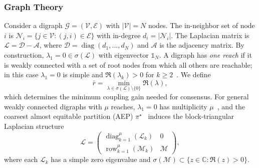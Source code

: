 \documentclass[12pt]{elsarticle}
\theoremstyle{remark}
\DeclareMathOperator{\diag}{diag}
\DeclareMathOperator{\row}{row}
\newcommand{\C}{\mathbb{C}}
\newcommand{\ones}{\mathbb{1}}
\begin{document}
\subsubsection{Graph Theory}
\label{subsec:graphs}
Consider a digraph $\mathcal{G} = (\mathcal{V}, \mathcal{E})$ with $|\mathcal{V}| = N$ nodes. The in-neighbor set of node $i$ is $\mathcal{N}_i = \{j \in \mathcal{V} : (j,i) \in \mathcal{E}\}$ with in-degree $d_i = |\mathcal{N}_i|$. The Laplacian matrix is $\mathcal{L} = \mathcal{D} - \mathcal{A}$, where $\mathcal{D} = \diag(d_1, \ldots, d_N)$ and $\mathcal{A}$ is the adjacency matrix. By construction, $\lambda_1 = 0 \in \sigma(\mathcal{L})$ with eigenvector $\ones_N$. A digraph has \emph{one reach} if it is weakly connected with a set of root nodes from which all others are reachable; in this case $\lambda_1 = 0$ is simple and $\Re(\lambda_k) > 0$ for $k \geq 2$~\cite{caughman2006}. We define
\begin{equation}
\bar{r} = \min_{\lambda \in \sigma(\mathcal{L}) \setminus \{0\}} \Re(\lambda),
\label{eq:rbar}
\end{equation}
which determines the minimum coupling gain needed for consensus. For general weakly connected digraphs with $\mu$ reaches, $\lambda_1 = 0$ has multiplicity $\mu$~\cite{caughman2006}, and the coarsest almost equitable partition (AEP) $\pi^\star$~\cite{monaco2019} induces the block-triangular Laplacian structure
\begin{equation}
\mathcal{L} = \begin{pmatrix} \diag_{k=1}^{\mu}(\mathcal{L}_k) & 0 \\ \row_{k=1}^{\mu}(\mathcal{M}_k) & \mathcal{M} \end{pmatrix},
\label{eq:L_block}
\end{equation}
where each $\mathcal{L}_k$ has a simple zero eigenvalue and $\sigma(\mathcal{M}) \subset \{z \in \C : \Re(z) > 0\}$.
\end{document}
